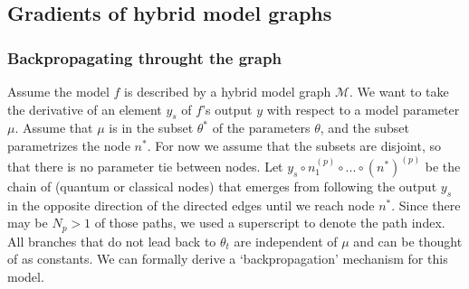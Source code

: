 \documentclass[aps,pra,10pt,twocolumn,groupedaddress,nofootinbib]{revtex4-1}
\theoremstyle{plain}
\begin{document}
\subsection{Gradients of hybrid model graphs}

\subsubsection{Backpropagating throught the graph}

Assume the model $f$ is described by a hybrid model graph $\mathcal{M}$. We want to take the derivative of an element $y_s$ of $f$'s output $y$ with respect to a model parameter $\mu$. Assume that $\mu$ is in the subset $\theta^*$ of the parameters $\theta$, and the subset parametrizes the node $n^*$. For now we assume that the subsets are disjoint, so that there is no parameter tie between nodes. Let $y_s \circ n^{(p)}_1 \circ ... \circ (n^*)^{(p)}$ be the chain of (quantum or classical nodes) that emerges from following the output $y_s$ in the opposite direction of the directed edges until we reach node $n^*$. Since there may be $N_p > 1$ of those paths, we used a superscript to denote the path index. All branches that do not lead back to $\theta_t$ are independent of $\mu$ and can be thought of as constants. We can formally derive a `backpropagation' mechanism for this model.\\
\end{document}
